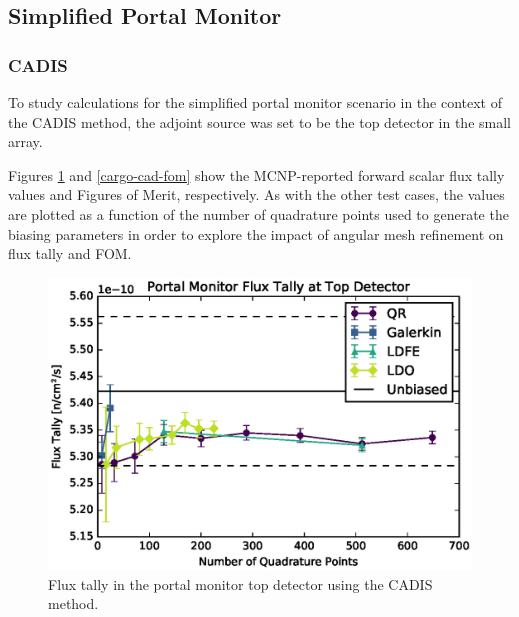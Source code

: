 \documentclass{article} %
\begin{document}
\subsection{Simplified Portal Monitor}

\subsubsection{CADIS}

To study calculations for the simplified portal monitor scenario in the context
of the CADIS method, the adjoint source was set to be the top detector in the
small array.

Figures \ref{cargo-cad-tally} and \ref{cargo-cad-fom} show the MCNP-reported
forward scalar flux tally values and Figures of Merit, respectively. As with
the other test cases, the values are plotted as a function of the number of
quadrature points used to generate the biasing parameters in order to explore
the impact of angular mesh refinement on flux tally and FOM.

\begin{figure}[!htb]
\centering
\includegraphics[max height=0.445\textheight]{img/portal-cadis-tally.eps}
\caption{Flux tally in the portal monitor top detector using the CADIS method.}
\label{cargo-cad-tally}
\end{figure}
\end{document}
